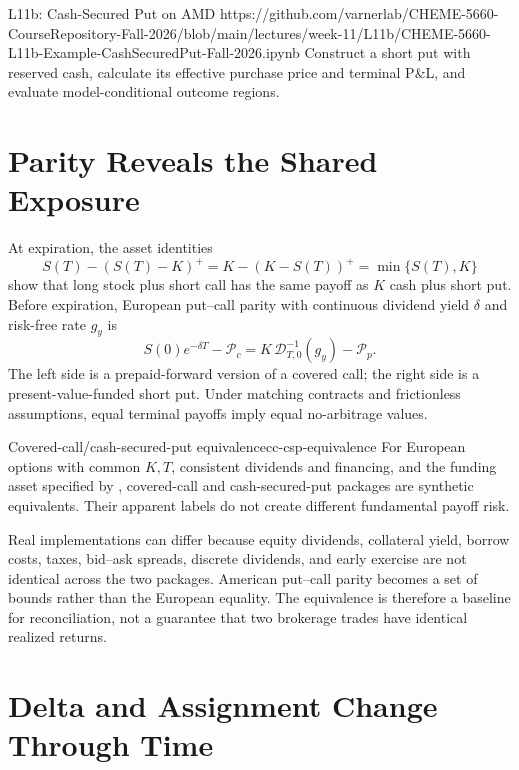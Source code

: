 \documentclass[11pt]{article}
\begin{document}
\notebooklink
  {L11b: Cash-Secured Put on AMD}
  {https://github.com/varnerlab/CHEME-5660-CourseRepository-Fall-2026/blob/main/lectures/week-11/L11b/CHEME-5660-L11b-Example-CashSecuredPut-Fall-2026.ipynb}
  {Construct a short put with reserved cash, calculate its effective purchase price and terminal P\&L, and evaluate model-conditional outcome regions.}

\section{Parity Reveals the Shared Exposure}

At expiration, the asset identities
\begin{equation}
  \label{eq:terminal-parity}
  S(T)-(S(T)-K)^+
  =K-(K-S(T))^+
  =\min\{S(T),K\}
\end{equation}
show that long stock plus short call has the same payoff as $K$ cash plus short put. Before expiration, European put--call parity with continuous dividend yield $\delta$ and risk-free rate $g_y$ is
\begin{equation}
  \label{eq:put-call-parity}
  S(0)e^{-\delta T}-\mathcal P_c=K\,\mathcal D^{-1}_{T,0}(g_y)-\mathcal P_p.
\end{equation}
The left side is a prepaid-forward version of a covered call; the right side is a present-value-funded short put. Under matching contracts and frictionless assumptions, equal terminal payoffs imply equal no-arbitrage values.

\begin{theorem}{Covered-call/cash-secured-put equivalence}{cc-csp-equivalence}
For European options with common $K,T$, consistent dividends and financing, and the funding asset specified by , covered-call and cash-secured-put packages are synthetic equivalents. Their apparent labels do not create different fundamental payoff risk.
\end{theorem}

Real implementations can differ because equity dividends, collateral yield, borrow costs, taxes, bid--ask spreads, discrete dividends, and early exercise are not identical across the two packages. American put--call parity becomes a set of bounds rather than the European equality. The equivalence is therefore a baseline for reconciliation, not a guarantee that two brokerage trades have identical realized returns.

\section{Delta and Assignment Change Through Time}
\end{document}
